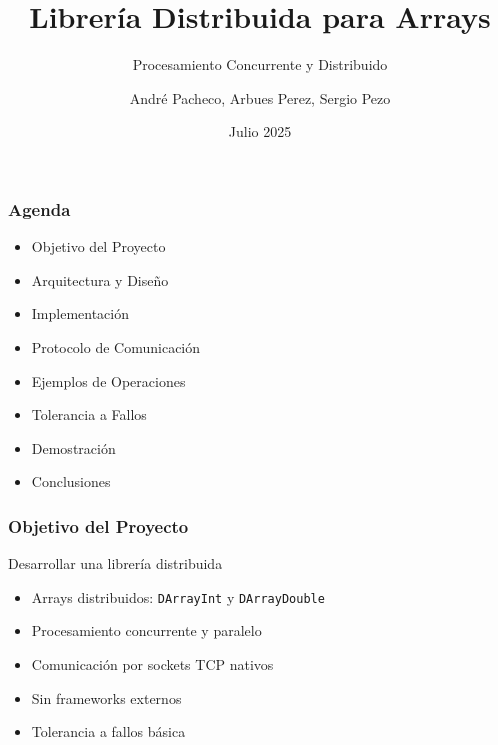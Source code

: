 \documentclass{beamer}
\title{Librería Distribuida para Arrays}
\subtitle{Procesamiento Concurrente y Distribuido}
\author{André Pacheco, Arbues Perez, Sergio Pezo}
\date{Julio 2025}
\begin{document}
\maketitle

\begin{frame}
\frametitle{Agenda}
\begin{itemize}
    \item Objetivo del Proyecto
    \item Arquitectura y Diseño
    \item Implementación
    \item Protocolo de Comunicación
    \item Ejemplos de Operaciones
    \item Tolerancia a Fallos
    \item Demostración
    \item Conclusiones
\end{itemize}
\end{frame}

\begin{frame}
\frametitle{Objetivo del Proyecto}
\begin{block}{Desarrollar una librería distribuida}
    \begin{itemize}
        \item<1-> Arrays distribuidos: \texttt{DArrayInt} y \texttt{DArrayDouble}
        \item<2-> Procesamiento concurrente y paralelo
        \item<3-> Comunicación por sockets TCP nativos
        \item<4-> Sin frameworks externos
        \item<5-> Tolerancia a fallos básica
    \end{itemize}
\end{block}

\end{frame}
\end{document}
